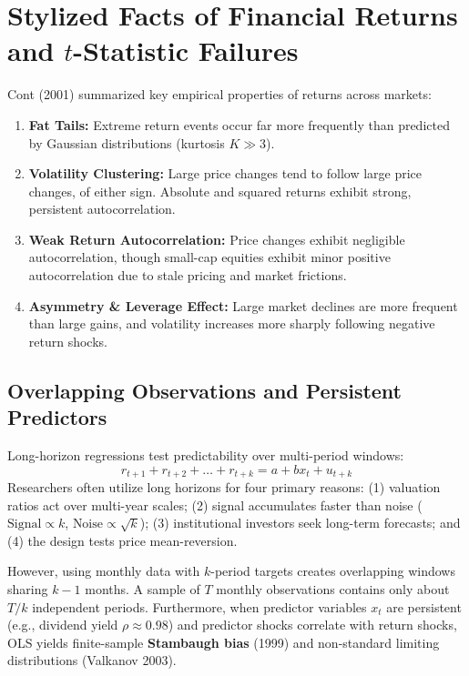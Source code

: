 \section{Stylized Facts of Financial Returns and $t$-Statistic Failures}
\label{sec:03-facts}

Cont (2001) summarized key empirical properties of returns across markets:
\begin{enumerate}
  \item \textbf{Fat Tails:} Extreme return events occur far more frequently than predicted by Gaussian distributions (kurtosis $K \gg 3$).
  \item \textbf{Volatility Clustering:} Large price changes tend to follow large price changes, of either sign. Absolute and squared returns exhibit strong, persistent autocorrelation.
  \item \textbf{Weak Return Autocorrelation:} Price changes exhibit negligible autocorrelation, though small-cap equities exhibit minor positive autocorrelation due to stale pricing and market frictions.
  \item \textbf{Asymmetry \& Leverage Effect:} Large market declines are more frequent than large gains, and volatility increases more sharply following negative return shocks.
\end{enumerate}

\subsection{Overlapping Observations and Persistent Predictors}
Long-horizon regressions test predictability over multi-period windows:
\begin{equation}
  r_{t+1} + r_{t+2} + \dots + r_{t+k} = a + b x_t + u_{t+k}
  \label{eq:03-overlap}
\end{equation}
Researchers often utilize long horizons for four primary reasons: (1) valuation ratios act over multi-year scales; (2) signal accumulates faster than noise ($\text{Signal} \propto k$, $\text{Noise} \propto \sqrt{k}$); (3) institutional investors seek long-term forecasts; and (4) the design tests price mean-reversion.

However, using monthly data with $k$-period targets creates overlapping windows sharing $k-1$ months. A sample of $T$ monthly observations contains only about $T/k$ independent periods. Furthermore, when predictor variables $x_t$ are persistent (e.g., dividend yield $\rho \approx 0.98$) and predictor shocks correlate with return shocks, OLS yields finite-sample \textbf{Stambaugh bias} (1999) and non-standard limiting distributions (Valkanov 2003).

